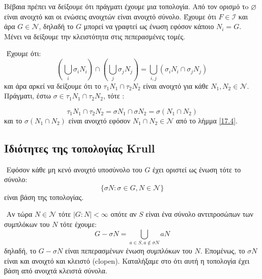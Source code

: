 \documentclass[oneside,a4paper]{article}
\newcommand {\tl}{\textlatin}
\begin{document}
\noindent Βέβαια πρέπει να δείξουμε ότι πράγματι έχουμε μια τοπολογία. Από τον ορισμό τo $\varnothing$ είναι ανοιχτό και οι ενώσεις ανοιχτών είναι ανοιχτό σύνολο. Έχουμε ότι $F \in \mathcal{I}$ και άρα $G \in \mathcal{N}$, δηλαδή το $G$ μπορεί να γραφτεί ως ένωση εφόσον κάποιο $N_i = G$. Μένει να δείξουμε την κλειστότητα στις πεπερασμένες τομές.

$ $\newline
Έχουμε ότι: 
$$\left(\bigcup_i \sigma_i N_i \right) \cap \left(\bigcup_j \sigma_j N_j \right) = \bigcup_{i, j} \left( \sigma_i N_i \cap \sigma_j N_j \right)$$
και άρα αρκεί να δείξουμε ότι το $\tau_1 N_1 \cap \tau_2 N_2$ είναι ανοιχτό για κάθε $N_1, N_2 \in \mathcal{N}$. Πράγματι, έστω $\sigma \in \tau_1 N_1 \cap \tau_2 N_2$, τότε :

$$\tau_1 N_1 \cap \tau_2 N_2 = \sigma N_1 \cap \sigma N_2 = \sigma (N_1 \cap N_2)$$
και το $\sigma (N_1 \cap N_2)$ είναι ανοιχτό εφόσον $N_1 \cap N_2 \in \mathcal{N}$ από το λήμμα \ref{17.4}.

\subsection{Ιδιότητες της τοπολογίας \tl{Krull}}

$ $\newline
\noindent Εφόσον κάθε μη κενό ανοιχτό υποσύνολο του $G$ έχει οριστεί ως ένωση τότε το σύνολο:
$$\{\sigma N : \sigma \in G , N \in \mathcal{N} \}$$
είναι βάση της τοπολογίας.

$ $\newline
\noindent Αν τώρα $N \in \mathcal{N}$ τότε $|G:N|<\infty$ οπότε αν $S$ είναι ένα σύνολο αντιπροσώπων των συμπλόκων του $N$ τότε έχουμε:
$$G-\sigma N = \bigcup\limits_{a\in S, a\not\in \sigma N} aN$$
δηλαδή, το $G-\sigma N$ είναι πεπερασμένων ένωση συμπλόκων του $N$. Επομένως, το $\sigma N$ είναι και ανοιχτό και κλειστό (\tl{clopen}).
Καταλήξαμε στο ότι αυτή η τοπολογία έχει βάση από ανοιχτά κλειστά σύνολα.
\end{document}
